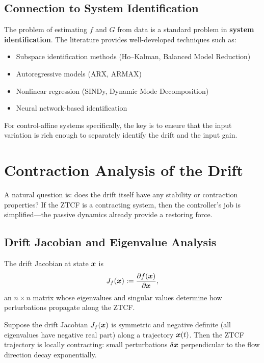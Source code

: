 \subsection{Connection to System Identification}

The problem of estimating $f$ and $G$ from data is a standard problem in \textbf{system
identification}. The literature provides well-developed techniques such as:
\begin{itemize}
\item Subspace identification methods (Ho--Kalman, Balanced Model Reduction)
\item Autoregressive models (ARX, ARMAX)
\item Nonlinear regression (SINDy, Dynamic Mode Decomposition)
\item Neural network-based identification
\end{itemize}

For control-affine systems specifically, the key is to ensure that the input variation is
rich enough to separately identify the drift and the input gain.

\section{Contraction Analysis of the Drift}

A natural question is: does the drift itself have any stability or contraction properties?
If the ZTCF is a contracting system, then the controller's job is simplified---the passive
dynamics already provide a restoring force.

\subsection{Drift Jacobian and Eigenvalue Analysis}

\begin{definition}
\label{def:ch7:drift-jacobian}
The drift Jacobian at state $\bm{x}$ is
\begin{equation}
J_f(\bm{x}) := \frac{\partial f(\bm{x})}{\partial \bm{x}},
\label{eq:ch7:drift-jacobian}
\end{equation}
an $n \times n$ matrix whose eigenvalues and singular values determine how perturbations
propagate along the ZTCF.
\end{definition}

\begin{theorem}
\label{thm:ch7:drift-contraction}
Suppose the drift Jacobian $J_f(\bm{x})$ is symmetric and negative definite (all eigenvalues
have negative real part) along a trajectory $\bm{x}(t)$. Then the ZTCF trajectory is locally
contracting: small perturbations $\delta\bm{x}$ perpendicular to the flow direction decay
exponentially.
\end{theorem}

